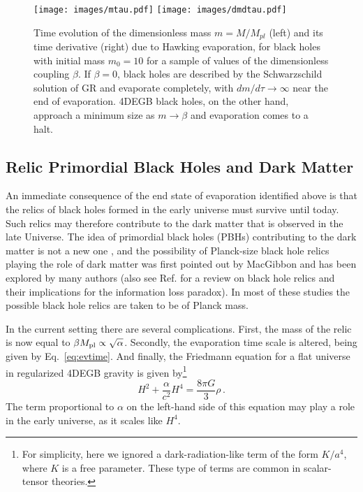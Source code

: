 \documentclass[reprint,amsmath,amssymbGaps,onecolumn,notitlepage,nofootinbib]{revtex4-1}
\newcommand{\mpl}{M_{\rm pl}}
\begin{document}
\begin{figure}[ht!]
\centering
\texttt{[image: images/mtau.pdf]}\hfill
\texttt{[image: images/dmdtau.pdf]}
\caption{Time evolution of the dimensionless mass $m=M/M_{pl}$ (left) and its time derivative (right) due to Hawking evaporation, for black holes with initial mass $m_0=10$ for a sample of values of the dimensionless coupling $\beta$. If $\beta=0$, black holes are described by the Schwarzschild solution of GR and evaporate completely, with $dm/d\tau \to \infty$ near the end of evaporation. 4DEGB black holes, on the other hand, approach a minimum size as $m \to \beta$ and evaporation comes to a halt.}
\label{fig:evaporation}
\end{figure}

\subsection{Relic Primordial Black Holes and Dark Matter}

An immediate consequence of the end state of evaporation identified above is that the relics of black holes formed in the early universe must survive until today. Such relics may therefore contribute to the dark matter that is observed in the late Universe. The idea of primordial black holes (PBHs) contributing to the dark matter is not a new one \cite{Carr:2020gox,Carr:2020xqk}, and the possibility of Planck-size black hole relics playing the role of dark matter was first pointed out by MacGibbon \cite{MacGibbon:1987my} and has been explored by many authors \cite{Rasanen:2018fom,PhysRevD.46.645,Green:1997sz,Alexeyev:2002tg,Chen:2002tu,Chen:2004ft,Nozari:2005ah,Barrau:2003xp,Carr:1994ar,Lehmann:2019zgt,deFreitasPacheco:2020wdg,Bai:2019zcd,Kovacik:2021qms,Gennaro:2021amf,Lehmann:2021ijf} (also see Ref. \cite{Chen:2014jwq} for a review on black hole relics and their implications for the information loss paradox). In most of these studies the possible black hole relics are taken to be of Planck mass.

In the current setting there are several complications. First, the mass of the relic is now equal to $\beta \mpl \propto \sqrt{\alpha}$. Secondly, the evaporation time scale is altered, being given by Eq.~\eqref{eq:evtime}. And finally, the Friedmann equation for a flat universe in regularized 4DEGB gravity is given by\footnote{For simplicity, here we ignored a dark-radiation-like term of the form $K/a^4$, where $K$ is a free parameter. These type of terms are common in scalar-tensor theories.} \cite{Fernandes:2021dsb}
\begin{equation}
H^2 + \frac{\alpha}{c^2} H^4 = \frac{8\pi G}{3} \rho\,.
\label{eq:flatFried}
\end{equation}
The term proportional to $\alpha$ on the left-hand side of this equation may play a role in the early universe, as it scales like $H^4$. 
\end{document}
